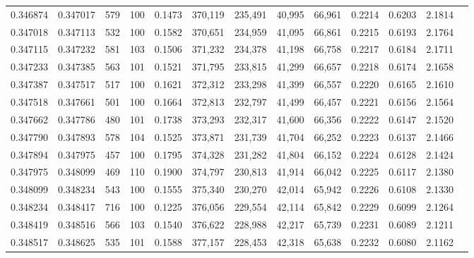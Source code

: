 \begin{tabular}{rrrrrrrrrrrrr}
0.346874 & 0.347017 &   579 & 100 &                                     0.1473 & 370,119 & 235,491 &  40,995 &  66,961 & 0.2214 & 0.6203 & 2.1814 \\
0.347018 & 0.347113 &   532 & 100 &                                     0.1582 & 370,651 & 234,959 &  41,095 &  66,861 & 0.2215 & 0.6193 & 2.1764 \\
0.347115 & 0.347232 &   581 & 103 &                                     0.1506 & 371,232 & 234,378 &  41,198 &  66,758 & 0.2217 & 0.6184 & 2.1711 \\
0.347233 & 0.347385 &   563 & 101 &                                     0.1521 & 371,795 & 233,815 &  41,299 &  66,657 & 0.2218 & 0.6174 & 2.1658 \\
0.347387 & 0.347517 &   517 & 100 &                                     0.1621 & 372,312 & 233,298 &  41,399 &  66,557 & 0.2220 & 0.6165 & 2.1610 \\
0.347518 & 0.347661 &   501 & 100 &                                     0.1664 & 372,813 & 232,797 &  41,499 &  66,457 & 0.2221 & 0.6156 & 2.1564 \\
0.347662 & 0.347786 &   480 & 101 &                                     0.1738 & 373,293 & 232,317 &  41,600 &  66,356 & 0.2222 & 0.6147 & 2.1520 \\
0.347790 & 0.347893 &   578 & 104 &                                     0.1525 & 373,871 & 231,739 &  41,704 &  66,252 & 0.2223 & 0.6137 & 2.1466 \\
0.347894 & 0.347975 &   457 & 100 &                                     0.1795 & 374,328 & 231,282 &  41,804 &  66,152 & 0.2224 & 0.6128 & 2.1424 \\
0.347975 & 0.348099 &   469 & 110 &                                     0.1900 & 374,797 & 230,813 &  41,914 &  66,042 & 0.2225 & 0.6117 & 2.1380 \\
0.348099 & 0.348234 &   543 & 100 &                                     0.1555 & 375,340 & 230,270 &  42,014 &  65,942 & 0.2226 & 0.6108 & 2.1330 \\
0.348234 & 0.348417 &   716 & 100 &                                     0.1225 & 376,056 & 229,554 &  42,114 &  65,842 & 0.2229 & 0.6099 & 2.1264 \\
0.348419 & 0.348516 &   566 & 103 &                                     0.1540 & 376,622 & 228,988 &  42,217 &  65,739 & 0.2231 & 0.6089 & 2.1211 \\
0.348517 & 0.348625 &   535 & 101 &                                     0.1588 & 377,157 & 228,453 &  42,318 &  65,638 & 0.2232 & 0.6080 & 2.1162 \\

\end{tabular}
